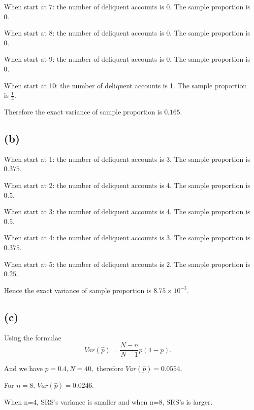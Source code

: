 \documentclass[12pt]{article}%
\begin{document}
When start at 7: the number of deliquent accounts is 0. The sample proportion is $0.$ 

When start at 8: the number of deliquent accounts is 0. The sample proportion is $0.$ 

When start at 9: the number of deliquent accounts is 0. The sample proportion is $0.$ 

When start at 10: the number of deliquent accounts is 1. The sample proportion is $\frac{1}{4}.$ 

Therefore the exact variance of sample proportion is $0.165.$

\subsection{(b)}
When start at 1: the number of deliquent accounts is 3. The sample proportion is $0.375.$

When start at 2: the number of deliquent accounts is 4. The sample proportion is $0.5.$

When start at 3: the number of deliquent accounts is 4. The sample proportion is $0.5.$

When start at 4: the number of deliquent accounts is 3. The sample proportion is $0.375.$

When start at 5: the number of deliquent accounts is 2. The sample proportion is $0.25.$

Hence the exact variance of sample proportion is $8.75\times 10^{-3}.$

\subsection{(c)}
Using the formulae $$Var(\hat{p})=\frac{N-n}{N-1}p(1-p).$$

And we have $p=0.4, N=40,$ therefore $Var(\hat{p})=0.0554.$

For $n=8$, $Var(\hat{p})=0.0246.$

When n=4, SRS's variance is smaller and when n=8, SRS's is larger.
\end{document}
